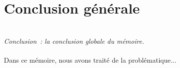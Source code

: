 \documentclass[a4paper,11pt,twoside]{memoir}
\begin{document}

\cleardoublepage{} %
\chapter*{Conclusion générale}
\adjustmtc
{}
\textit{\\Conclusion~: la conclusion globale du mémoire.}\\\\
Dans ce mémoire, nous avons traité de la problématique...\\\\




\cleardoublepage{}
 

\appendix
\cleardoublepage{}

%



\cleardoublepage %
\printindex %

\end{document}
